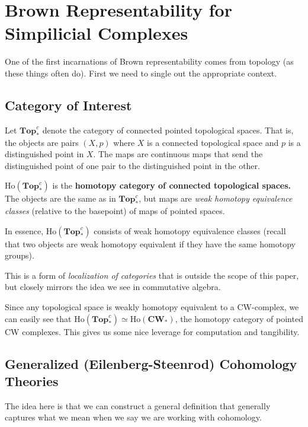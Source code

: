 \documentclass[12pt]{article}
\newcommand*{\pTopc}{\mathbf{Top}_\ast^c}
\begin{document}
\section{Brown Representability for Simpilicial Complexes}
One of the first incarnations of Brown representability comes from topology (as these things often do). First we need to single out 
the appropriate context.

\subsection{Category of Interest}
\begin{defn}
	Let $\pTopc$ denote the category of connected pointed topological spaces. That is, the objects are pairs $(X,p)$ where $X$ is a connected 
	topological space and $p$ is a distinguished point in $X$. The maps are continuous maps that send the distinguished point of one pair to the distinguished point in the other.
\end{defn}
\begin{defn}
	$\text{Ho}(\pTopc)$ is the \textbf{homotopy category of connected topological spaces.} The objects are the same as in $\pTopc$, 
	but maps are \textit{weak homotopy equivalence classes} (relative to the basepoint) of maps of pointed spaces.
\end{defn}
\begin{rmk}
	In essence, $\text{Ho}(\pTopc)$ consists of weak homotopy equivalence classes (recall that two objects are weak homotopy equivalent if they have the same 
	homotopy groups).
\end{rmk}
\begin{rmk}
	This is a form of \textit{localization of categories} that is outside the scope of this paper, but closely mirrors the idea 
	we see in commutative algebra.
\end{rmk}
\begin{rmk}
	Since any topological space is weakly homotopy equivalent to a CW-complex, we can easily see that 
	$\text{Ho}(\pTopc)\simeq\text{Ho}(\mathbf{CW}_\ast)$, the homotopy category of pointed CW complexes. This gives us some nice leverage for computation and tangibility.
\end{rmk}

\subsection{Generalized (Eilenberg-Steenrod) Cohomology Theories}
The idea here is that we can construct a general definition that generally captures what we mean when we say we are 
working with cohomology.
\end{document}
